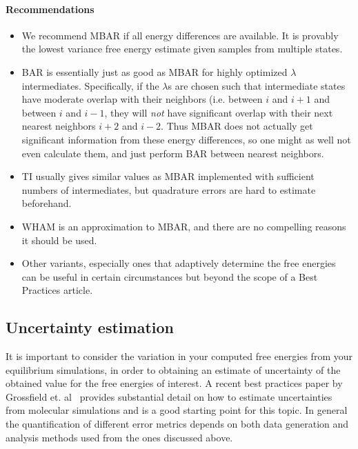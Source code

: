 \documentclass[9pt,bestpractices]{livecoms}
\begin{document}
\paragraph{Recommendations}
\begin{itemize}
\item We recommend MBAR if all energy differences are available. It is provably the lowest variance free energy estimate given samples from multiple states.
\item BAR is essentially just as good as MBAR for highly optimized $\lambda$ intermediates. Specifically, if the $\lambda$s are chosen such that intermediate states have moderate overlap with their neighbors (i.e. between $i$ and $i+1$ and between $i$ and $i-1$, they will \textit{not} have significant overlap with their next nearest neighbors $i+2$ and $i-2$. Thus MBAR does not actually get significant information from these energy differences, so one might as well not even calculate them, and just perform BAR between nearest neighbors.~\cite{paliwal2011benchmark} 
\item TI usually gives similar values as MBAR implemented with sufficient numbers of intermediates, but quadrature errors are hard to estimate beforehand.~\cite{paliwal2011benchmark}
\item WHAM is an approximation to MBAR, and there are no compelling reasons it should be used. 
\item Other variants, especially ones that adaptively determine the free energies can be  useful in certain circumstances but beyond the scope of a Best Practices article.
\end{itemize}
%
\subsection{Uncertainty estimation}
\label{subsec:uncertainty}
It is important to consider the variation in your computed free energies from your equilibrium simulations, in order  to  obtaining an estimate of  uncertainty of the obtained value for the free energies of interest. A recent best practices paper by Grossfield et. al~\cite{grossfield2018best} provides substantial detail on how to estimate uncertainties from molecular simulations and is a good starting point for this topic. 
In general the quantification of different error metrics depends on both data generation and analysis methods  used from the ones discussed above. 
\end{document}
